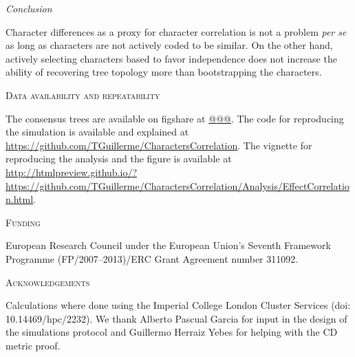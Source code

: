 \documentclass[12pt,letterpaper]{article}
\renewcommand{\section}[1]{%
\bigskip
\begin{center}
\begin{Large}
\normalfont\scshape #1
\medskip
\end{Large}
\end{center}}
\renewcommand{\subsection}[1]{%
\bigskip
\begin{center}
\begin{large}
\normalfont\itshape #1
\end{large}
\end{center}}
\begin{document}
\subsection{Conclusion}
Character differences as a proxy for character correlation is not a problem \textit{per se} as long as characters are not actively coded to be similar.
On the other hand, actively selecting characters based to favor independence does not increase the ability of recovering tree topology more than bootstrapping the characters.

\section{Data availability and repeatability}
The consensus trees are available on figshare at \url{@@@}.
The code for reproducing the simulation is available and explained at \url{https://github.com/TGuillerme/CharactersCorrelation}.
The vignette for reproducing the analysis and the figure is available at \url{http://htmlpreview.github.io/?https://github.com/TGuillerme/CharactersCorrelation/Analysis/EffectCorrelation.html}.


\section{Funding}
European Research Council under the European Union’s Seventh Framework Programme (FP/2007–2013)/ERC Grant Agreement number 311092.


\section{Acknowledgements}
Calculations where done using the Imperial College London Cluster Services (doi: 10.14469/hpc/2232).
We thank Alberto Pascual Garcia for input in the design of the simulations protocol and Guillermo Herraiz Yebes for helping with the CD metric proof.






\end{document}
